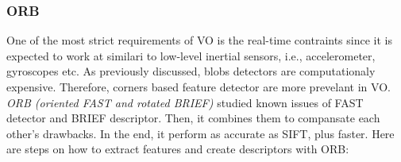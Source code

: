 \documentclass[a4paper]{report}
\numberwithin{figure}{section}
\begin{document}
\subsubsection{ORB} \label{sb_sc_orb}

One of the most strict requirements of VO is the real-time contraints since it is 
expected to work at similari to low-level inertial sensors, i.e., accelerometer, gyroscopes etc. 
As previously discussed, blobs detectors are computationaly expensive. Therefore, 
corners based feature detector are more prevelant in VO. 
\textit{ORB (oriented FAST and rotated BRIEF)} studied known issues of 
FAST detector and BRIEF descriptor. Then, it combines them to compansate each 
other's drawbacks. In the end,
it perform as accurate as SIFT, plus faster. Here are steps on how to extract features 
and create descriptors with ORB: 
\end{document}

